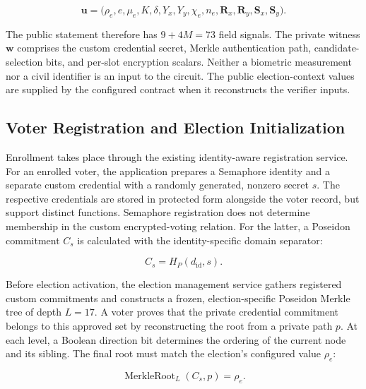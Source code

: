 \begin{equation}
\label{eq:protocol-public-inputs}
\mathbf{u}=\bigl(
\rho_e,e,\mu_e,K,\delta,Y_x,Y_y,\chi_e,n_e,
\mathbf{R}_x,\mathbf{R}_y,\mathbf{S}_x,\mathbf{S}_y
\bigr).
\end{equation}

The public statement therefore has $9+4M=73$ field signals.
The private witness $\mathbf{w}$ comprises the custom credential secret,
Merkle authentication path, candidate-selection bits, and per-slot
encryption scalars. Neither a biometric measurement nor a civil identifier
is an input to the circuit. The public election-context values are supplied
by the configured contract when it reconstructs the verifier inputs.

\subsection{Voter Registration and Election Initialization}
\label{subsec:architecture-registration}
\label{subsec:protocol-eligibility}

Enrollment takes place through the existing identity-aware registration
service. For an enrolled voter, the application prepares a Semaphore
identity and a separate custom credential with a randomly generated,
nonzero secret $s$. The respective credentials are stored in protected
form alongside the voter record, but support distinct functions.
Semaphore registration does not determine membership in the custom
encrypted-voting relation. For the latter, a Poseidon commitment $C_s$
is calculated with the identity-specific domain separator:

\begin{equation}
\label{eq:protocol-identity}
C_s=H_P(d_{\mathrm{id}},s).
\end{equation}

Before election activation, the election management service gathers
registered custom commitments and constructs a frozen, election-specific
Poseidon Merkle tree of depth $L=17$. A voter proves that the private
credential commitment belongs to this approved set by reconstructing the
root from a private path $p$. At each level, a Boolean direction bit
determines the ordering of the current node and its sibling. The final
root must match the election's configured value $\rho_e$:

\begin{equation}
\label{eq:protocol-merkle}
\operatorname{MerkleRoot}_{L}(C_s,p)=\rho_e.
\end{equation}

